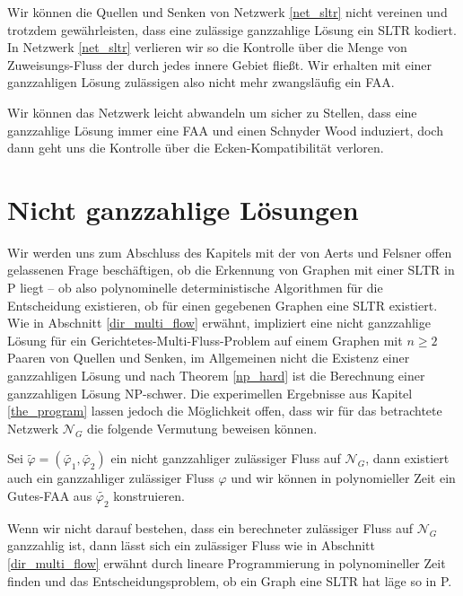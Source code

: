 \begin{remark}
Wir können die Quellen und Senken von Netzwerk \ref{net_sltr} nicht vereinen und trotzdem gewährleisten, dass eine zulässige ganzzahlige Lösung ein SLTR kodiert. In Netzwerk \ref{net_sltr} verlieren wir so die Kontrolle über die Menge von Zuweisungs-Fluss der durch jedes innere Gebiet fließt. Wir erhalten mit einer ganzzahligen Lösung zulässigen also nicht mehr zwangsläufig ein FAA.

Wir können das Netzwerk leicht abwandeln um sicher zu Stellen, dass eine ganzzahlige Lösung immer eine FAA und einen Schnyder Wood induziert, doch dann geht uns die Kontrolle über die Ecken-Kompatibilität verloren.
\end{remark}

\section{Nicht ganzzahlige Lösungen}

Wir werden uns zum Abschluss des Kapitels mit der von Aerts und Felsner offen gelassenen Frage beschäftigen, ob die Erkennung von Graphen mit einer SLTR in P liegt -- ob also polynominelle deterministische Algorithmen für die Entscheidung existieren, ob für einen gegebenen Graphen eine SLTR existiert. Wie in Abschnitt \ref{dir_multi_flow} erwähnt, impliziert eine nicht ganzzahlige Lösung für ein Gerichtetes-Multi-Fluss-Problem auf einem Graphen mit $n\geq 2$ Paaren von Quellen und Senken, im Allgemeinen nicht die Existenz einer ganzzahligen Lösung und nach Theorem \ref{np_hard} ist die Berechnung einer ganzzahligen Lösung NP-schwer. Die experimellen Ergebnisse aus Kapitel \ref{the_program} lassen jedoch die Möglichkeit offen, dass wir für das betrachtete Netzwerk $\mathcal{N}_G$ die folgende Vermutung beweisen können.

\begin{conjecture}\label{int_conj}
Sei $\tilde{\varphi}=(\tilde{\varphi_1},\tilde{\varphi_2})$ ein nicht ganzzahliger zulässiger Fluss auf $\mathcal{N}_G$, dann existiert auch ein ganzzahliger zulässiger Fluss $\varphi$ und wir können in polynomieller Zeit ein Gutes-FAA aus $\tilde{\varphi_2}$ konstruieren.
\end{conjecture}

\begin{remark}
Wenn wir nicht darauf bestehen, dass ein berechneter zulässiger Fluss auf $\mathcal{N}_G$ ganzzahlig ist, dann lässt sich ein zulässiger Fluss wie in Abschnitt \ref{dir_multi_flow} erwähnt durch lineare Programmierung in polynomineller Zeit finden und das Entscheidungsproblem, ob ein Graph eine SLTR hat läge so in P.
\end{remark}

